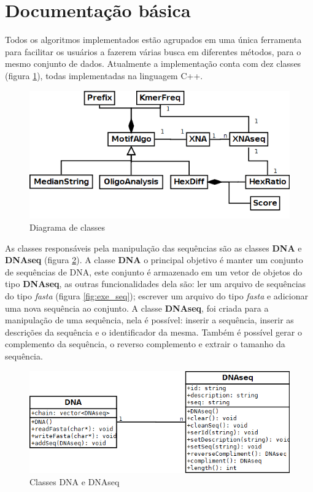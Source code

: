 \section{Documentação básica}

Todos os algoritmos implementados estão agrupados em uma única ferramenta para facilitar os usuários a fazerem várias busca em diferentes métodos, para o mesmo conjunto de dados. Atualmente a implementação conta com dez classes (figura \ref{fig:MotifAlgo2}), todas implementadas na linguagem C++.

\begin{figure}[htb!]
    \centering
    \includegraphics[scale=0.7]{./imagens/MotifAlgo2.png}
    \caption{Diagrama de classes}
    \label{fig:MotifAlgo2}
\end{figure}

As classes responsáveis pela manipulação das sequências são as classes \textbf{DNA} e \textbf{DNAseq} (figura \ref{fig:DNAeDNAseq}). A classe \textbf{DNA} o principal objetivo é manter um conjunto de sequências de DNA, este conjunto é armazenado em um vetor de objetos do tipo \textbf{DNAseq}, as outras funcionalidades dela são: ler um arquivo de sequências do tipo \textit{fasta} (figura \ref{fig:exe_seq}); escrever um arquivo do tipo \textit{fasta} e adicionar uma nova sequência ao conjunto. A classe  \textbf{DNAseq}, foi criada para a manipulação de uma sequência, nela é possível: inserir a sequência, inserir as descrições da sequência e o identificador da mesma. Também é possível gerar o complemento da sequência, o reverso complemento e extrair o tamanho da sequência.


\begin{figure}[htb!]
    \centering
    \includegraphics[scale=0.7]{./imagens/DNA.png}
    \caption{Classes DNA e DNAseq}
    \label{fig:DNAeDNAseq}
\end{figure}


